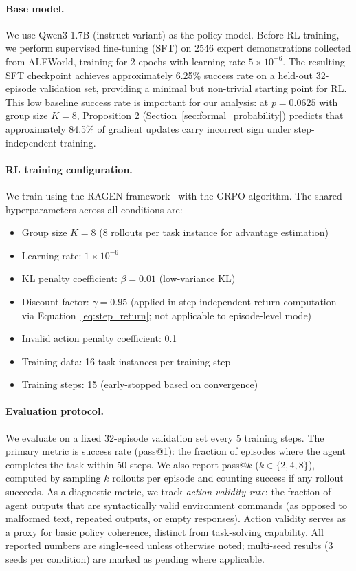 \paragraph{Base model.}
We use Qwen3-1.7B (instruct variant) as the policy model. Before RL training, we perform supervised fine-tuning (SFT) on 2546 expert demonstrations collected from ALFWorld, training for 2 epochs with learning rate $5 \times 10^{-6}$. The resulting SFT checkpoint achieves approximately 6.25\% success rate on a held-out 32-episode validation set, providing a minimal but non-trivial starting point for RL. This low baseline success rate is important for our analysis: at $p = 0.0625$ with group size $K = 8$, Proposition 2 (Section~\ref{sec:formal_probability}) predicts that approximately 84.5\% of gradient updates carry incorrect sign under step-independent training.

\paragraph{RL training configuration.}
We train using the RAGEN framework~\cite{ragen2025} with the GRPO algorithm. The shared hyperparameters across all conditions are:
\begin{itemize}
    \item Group size $K = 8$ (8 rollouts per task instance for advantage estimation)
    \item Learning rate: $1 \times 10^{-6}$
    \item KL penalty coefficient: $\beta = 0.01$ (low-variance KL)
    \item Discount factor: $\gamma = 0.95$ (applied in step-independent return computation via Equation~\ref{eq:step_return}; not applicable to episode-level mode)
    \item Invalid action penalty coefficient: 0.1
    \item Training data: 16 task instances per training step
    \item Training steps: 15 (early-stopped based on convergence)
\end{itemize}

\paragraph{Evaluation protocol.}
We evaluate on a fixed 32-episode validation set every 5 training steps. The primary metric is success rate (pass@1): the fraction of episodes where the agent completes the task within 50 steps. We also report pass@$k$ ($k \in \{2, 4, 8\}$), computed by sampling $k$ rollouts per episode and counting success if any rollout succeeds. As a diagnostic metric, we track \textit{action validity rate}: the fraction of agent outputs that are syntactically valid environment commands (as opposed to malformed text, repeated outputs, or empty responses). Action validity serves as a proxy for basic policy coherence, distinct from task-solving capability. All reported numbers are single-seed unless otherwise noted; multi-seed results (3 seeds per condition) are marked as pending where applicable.

